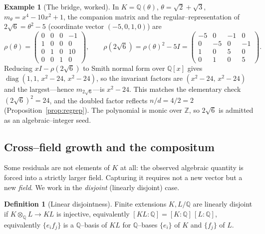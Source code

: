 \documentclass[11pt]{article}
\theoremstyle{plain}
\theoremstyle{definition}
\newtheorem{definition}[theorem]{Definition}
\newtheorem{example}[theorem]{Example}
\theoremstyle{remark}
\newcommand{\Q}{\mathbb{Q}}
\newcommand{\Z}{\mathbb{Z}}
\newcommand{\K}{K}
\DeclareMathOperator{\diag}{diag}
\begin{document}
\begin{example}[The bridge, worked]\label{ex:bridge}
In $\K=\Q(\theta)$, $\theta=\sqrt2+\sqrt3$, $m_\theta=x^4-10x^2+1$, the companion matrix and the
regular--representation of $2\sqrt6=\theta^2-5$ (coordinate vector $(-5,0,1,0)$) are
\[
  \rho(\theta)=\begin{pmatrix}0&0&0&-1\\1&0&0&0\\0&1&0&10\\0&0&1&0\end{pmatrix},\qquad
  \rho(2\sqrt6)=\rho(\theta)^2-5I=\begin{pmatrix}-5&0&-1&0\\0&-5&0&-1\\1&0&5&0\\0&1&0&5\end{pmatrix}.
\]
Reducing $xI-\rho(2\sqrt6)$ to Smith normal form over $\Q[x]$ gives $\diag(1,1,\,x^2-24,\,x^2-24)$, so the
invariant factors are $(x^2-24,\,x^2-24)$ and the largest---hence $m_{2\sqrt6}$---is $x^2-24$. This matches
the elementary check $(2\sqrt6)^2=24$, and the doubled factor reflects $n/d=4/2=2$
(Proposition~\ref{prop:regrep}). The polynomial is monic over $\Z$, so $2\sqrt6$ is admitted as an
algebraic--integer seed.
\end{example}

\subsection{Cross--field growth and the compositum}\label{subsec:compositum}
Some residuals are not elements of $\K$ at all: the observed algebraic quantity is forced into a strictly
larger field. Capturing it requires not a new vector but a new \emph{field}. We work in the
\emph{disjoint} (linearly disjoint) case.

\begin{definition}[Linear disjointness]\label{def:disjoint}
Finite extensions $\K,L/\Q$ are linearly disjoint if $\K\otimes_\Q L\to \K L$ is injective, equivalently
$[\K L:\Q]=[\K:\Q]\,[L:\Q]$, equivalently $\{e_if_j\}$ is a $\Q$--basis of $\K L$ for $\Q$--bases
$\{e_i\}$ of $\K$ and $\{f_j\}$ of $L$.
\end{definition}
\end{document}
